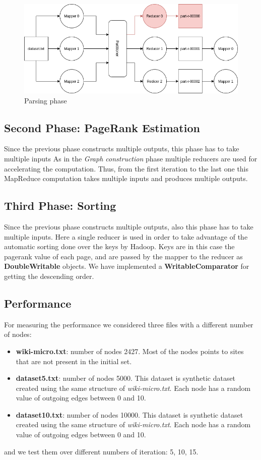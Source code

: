 \begin{figure}
	\includegraphics[width=\textwidth]{img/ParserSchema.png}
	\caption{Parsing phase}
	\label{fig:parsingPhase}     
\end{figure}

\subsection{Second Phase: PageRank Estimation}
Since the previous phase constructs multiple outputs, this phase has to take multiple inputs
As in the \textit{Graph construction} phase multiple reducers are used for accelerating the computation. Thus, from the first iteration to the last one this MapReduce computation takes multiple inputs and produces multiple outputs.

\subsection{Third Phase: Sorting}
Since the previous phase constructs multiple outputs, also this phase has to take multiple inputs. Here a single reducer is used in order to take advantage of the automatic sorting done over the keys by Hadoop. Keys are in this case the pagerank value of each page, and are passed by the mapper to the reducer as \textbf{DoubleWritable} objects. We have implemented a \textbf{WritableComparator} for getting the descending order.

\subsection{Performance}
For measuring the performance we considered three files with a different number of nodes:
\begin{itemize}
	\item \textbf{wiki-micro.txt}: number of nodes 2427. Most of the nodes points to sites that are not present in the initial set.
	\item \textbf{dataset5.txt}: number of nodes 5000. This dataset is synthetic dataset created using the same structure of \textit{wiki-micro.txt}. Each node has a random value of outgoing edges between 0 and 10.
	\item \textbf{dataset10.txt}: number of nodes 10000. This dataset is synthetic dataset created using the same structure of \textit{wiki-micro.txt}. Each node has a random value of outgoing edges between 0 and 10.
\end{itemize}
and we test them over different numbers of iteration: 5, 10, 15.

